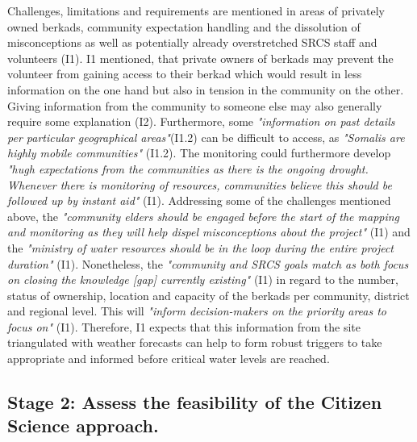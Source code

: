 Challenges, limitations and requirements are mentioned in areas of privately owned berkads, community expectation handling and the dissolution of misconceptions as well as potentially already overstretched SRCS staff and volunteers (I1). I1 mentioned, that private owners of berkads may prevent the volunteer from gaining access to their berkad which would result in less information on the one hand but also in tension in the community on the other. Giving information from the community to someone else may also generally require some explanation (I2). Furthermore, some \textit{"information on past details per particular geographical areas"}(I1.2) can be difficult to access, as \textit{"Somalis are highly mobile communities"} (I1.2). The monitoring could furthermore develop \textit{"hugh expectations from the communities as there is the ongoing drought. Whenever there is monitoring of resources, communities believe this should be followed up by instant aid"} (I1).\newline
Addressing some of the challenges mentioned above, the \textit{"community elders should be engaged before the start of the mapping and monitoring as they will help dispel misconceptions about the project"} (I1) and the \textit{"ministry of water resources should be in the loop during the entire project duration"} (I1). Nonetheless, the \textit{"community and SRCS goals match as both focus on closing the knowledge [gap] currently existing"} (I1) in regard to the number, status of ownership, location and capacity of the berkads per community, district and regional level. This will \textit{"inform decision-makers on the priority areas to focus on"} (I1). Therefore, I1 expects that this information from the site triangulated with weather forecasts can help to form robust triggers to take appropriate and informed  before critical water levels are reached.


\subsection{Stage 2: Assess the feasibility of the Citizen Science approach.}


